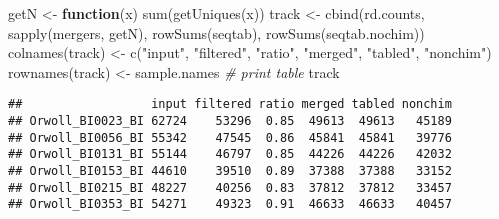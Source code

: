 \documentclass[
]{article}
\newenvironment{Shaded}{\begin{snugshade}}{\end{snugshade}}
\newcommand{\CommentTok}[1]{\textcolor[rgb]{0.56,0.35,0.01}{\textit{#1}}}
\newcommand{\ControlFlowTok}[1]{\textcolor[rgb]{0.13,0.29,0.53}{\textbf{#1}}}
\newcommand{\FunctionTok}[1]{\textcolor[rgb]{0.00,0.00,0.00}{#1}}
\newcommand{\NormalTok}[1]{#1}
\newcommand{\OtherTok}[1]{\textcolor[rgb]{0.56,0.35,0.01}{#1}}
\newcommand{\StringTok}[1]{\textcolor[rgb]{0.31,0.60,0.02}{#1}}
\begin{document}
\begin{Shaded}
\begin{Highlighting}[]
\NormalTok{getN }\OtherTok{\textless{}{-}} \ControlFlowTok{function}\NormalTok{(x) }\FunctionTok{sum}\NormalTok{(}\FunctionTok{getUniques}\NormalTok{(x))}
\NormalTok{track }\OtherTok{\textless{}{-}} \FunctionTok{cbind}\NormalTok{(rd.counts, }\FunctionTok{sapply}\NormalTok{(mergers, getN), }\FunctionTok{rowSums}\NormalTok{(seqtab), }
    \FunctionTok{rowSums}\NormalTok{(seqtab.nochim))}
\FunctionTok{colnames}\NormalTok{(track) }\OtherTok{\textless{}{-}} \FunctionTok{c}\NormalTok{(}\StringTok{"input"}\NormalTok{, }\StringTok{"filtered"}\NormalTok{, }\StringTok{"ratio"}\NormalTok{, }\StringTok{"merged"}\NormalTok{, }
    \StringTok{"tabled"}\NormalTok{, }\StringTok{"nonchim"}\NormalTok{)}
\FunctionTok{rownames}\NormalTok{(track) }\OtherTok{\textless{}{-}}\NormalTok{ sample.names}
\CommentTok{\# print table}
\NormalTok{track}
\end{Highlighting}
\end{Shaded}

\begin{verbatim}
##                  input filtered ratio merged tabled nonchim
## Orwoll_BI0023_BI 62724    53296  0.85  49613  49613   45189
## Orwoll_BI0056_BI 55342    47545  0.86  45841  45841   39776
## Orwoll_BI0131_BI 55144    46797  0.85  44226  44226   42032
## Orwoll_BI0153_BI 44610    39510  0.89  37388  37388   33152
## Orwoll_BI0215_BI 48227    40256  0.83  37812  37812   33457
## Orwoll_BI0353_BI 54271    49323  0.91  46633  46633   40457
\end{verbatim}
\end{document}
